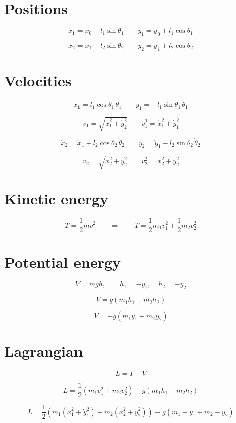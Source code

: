 \documentclass[11pt,a4paper]{article}
\begin{document}
\section{Positions}

\[ x_1 = x_0 + l_1 \sin\theta_1 \qquad y_1 = y_0 + l_1 \cos\theta_1 \]

\[ x_2 = x_1 + l_2 \sin\theta_2 \qquad y_2 = y_1 + l_2 \cos\theta_2 \]

\section{Velocities}

\[ \dot{x}_1 = l_1 \cos\theta_1 \, \dot{\theta}_1 \qquad \dot{y}_1 = -l_1 \sin\theta_1 \, \dot{\theta}_1 \]

\[ v_1 = \sqrt{\dot{x}_1^2 + \dot{y}_2^2} \qquad v_1^2 = \dot{x}_1^2 + \dot{y}_1^2 \]

\[ \dot{x}_2 = \dot{x}_1 + l_2 \cos\theta_2 \, \dot{\theta}_2 \qquad \dot{y}_2 = \dot{y}_1 - l_2 \sin\theta_2 \, \dot{\theta}_2 \]

\[ v_2 = \sqrt{\dot{x}_2^2 + \dot{y}_2^2} \qquad v_2^2 = \dot{x}_2^2 + \dot{y}_2^2 \]

\section{Kinetic energy}

\[ T = \frac{1}{2} m v^2 \qquad \Longrightarrow \qquad T = \frac{1}{2} m_1 v_1^2 + \frac{1}{2} m_2 v_2^2 \]

\section{Potential energy}

\[ V = m g h, \qquad h_1 = -y_1, \quad h_2 = -y_2 \]

\[ V = g (m_1 h_1 + m_2 h_2) \]

\[ V = -g (m_1 y_1 + m_2 y_2) \]

\section{Lagrangian}

\[ L = T - V \]

\[ L = \frac{1}{2} (m_1 v_1^2 + m_2 v_2^2) - g (m_1 h_1 + m_2 h_2) \]

\[ L = \frac{1}{2} \left( m_1 (\dot{x}_1^2 + \dot{y}_1^2) + m_2 (\dot{x}_2^2 + \dot{y}_2^2) \right) - g (m_1 - y_1 + m_2 - y_2) \]
\end{document}
